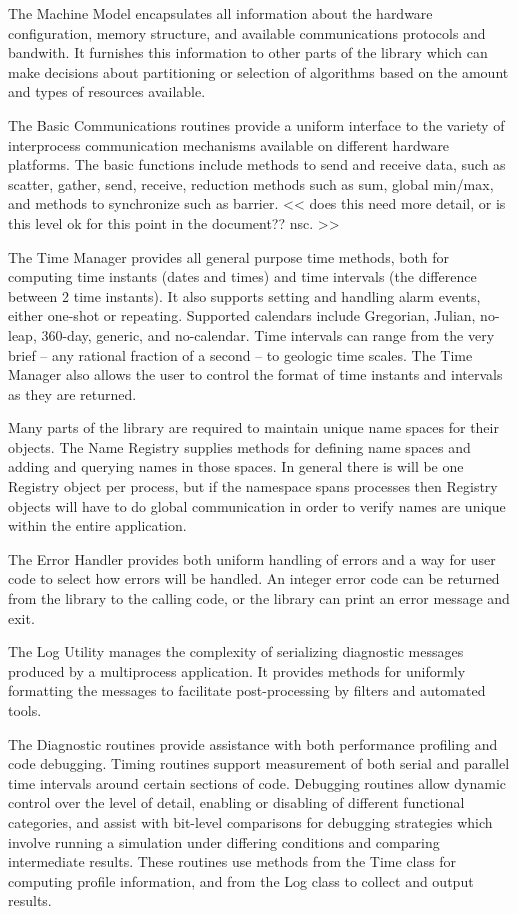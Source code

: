 The Machine Model encapsulates all information about the
hardware configuration, memory structure, and available
communications protocols and bandwith.  It furnishes this
information to other parts of the library which can
make decisions about partitioning or selection of algorithms
based on the amount and types of resources available.

The Basic Communications routines provide a uniform interface to
the variety of interprocess communication mechanisms available
on different hardware platforms.  
The basic functions include methods to send
and receive data, such as scatter, gather, send, receive,
reduction methods such as sum, global min/max, and methods
to synchronize such as barrier.  << does this need more
detail, or is this level ok for this point in the document??  nsc. >>

The Time Manager provides all general purpose time methods, both
for computing time instants (dates and times) and time intervals
(the difference between 2 time instants).   It also supports 
setting and handling alarm events, either one-shot or repeating.
Supported calendars include Gregorian, Julian, no-leap, 360-day, 
generic, and no-calendar.
Time intervals can range from the very brief -- any rational fraction
of a second -- to geologic time scales.
The Time Manager also allows the user to control the format of
time instants and intervals as they are returned.

Many parts of the library are required to maintain unique name
spaces for their objects.  The Name Registry supplies methods
for defining name spaces and adding and querying names in those
spaces.  In general there is will be one Registry object per
process, but if the namespace spans processes then Registry objects
will have to do global communication in order to verify names
are unique within the entire application.

The Error Handler provides both uniform handling of errors and
a way for user code to select how errors will be handled.
An integer error code can be returned from the library to the
calling code, or the library can print an error message and exit.

The Log Utility manages the complexity of serializing diagnostic
messages produced by a multiprocess application.  It provides
methods for uniformly formatting the messages to facilitate
post-processing by filters and automated tools.

The Diagnostic routines provide assistance with both performance
profiling and code debugging.  Timing routines support measurement
of both serial and parallel time intervals around certain sections
of code.  Debugging routines allow dynamic control over the level
of detail, enabling or disabling of different functional categories,
and assist with bit-level comparisons for debugging strategies which 
involve running a simulation under differing conditions and
comparing intermediate results.  These routines use methods from
the Time class for computing profile information, and from 
the Log class to collect and output results.

